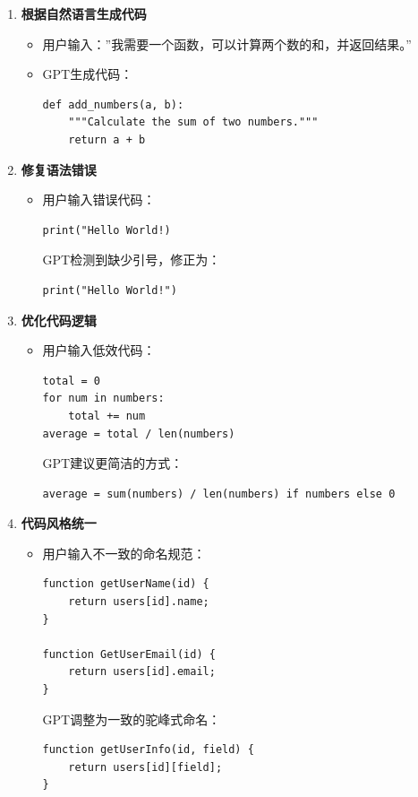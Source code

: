 \begin{enumerate}
\def\labelenumi{\arabic{enumi}.}
\item
  \textbf{根据自然语言生成代码}

  \begin{itemize}
  \item
    用户输入：''我需要一个函数，可以计算两个数的和，并返回结果。''
  \item
    GPT生成代码：

\begin{lstlisting}
def add_numbers(a, b):
    """Calculate the sum of two numbers."""
    return a + b
\end{lstlisting}


\end{itemize}

\item
  \textbf{修复语法错误}

  \begin{itemize}
  \item
    用户输入错误代码：

\begin{lstlisting}
print("Hello World!)
\end{lstlisting}

    GPT检测到缺少引号，修正为：

\begin{lstlisting}
print("Hello World!")
\end{lstlisting}
  \end{itemize}
\item
  \textbf{优化代码逻辑}

  \begin{itemize}
  \item
    用户输入低效代码：

\begin{lstlisting}
total = 0
for num in numbers:
    total += num
average = total / len(numbers)
\end{lstlisting}

    GPT建议更简洁的方式：

\begin{lstlisting}
average = sum(numbers) / len(numbers) if numbers else 0
\end{lstlisting}
  \end{itemize}
\item
  \textbf{代码风格统一}

  \begin{itemize}
  \item
    用户输入不一致的命名规范：

\begin{lstlisting}
function getUserName(id) {
    return users[id].name;
}

function GetUserEmail(id) {
    return users[id].email;
}
\end{lstlisting}

    GPT调整为一致的驼峰式命名：

\begin{lstlisting}
function getUserInfo(id, field) {
    return users[id][field];
}
\end{lstlisting}
  \end{itemize}
\end{enumerate}

